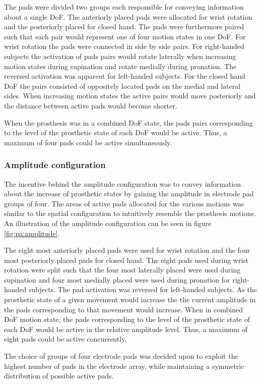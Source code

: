 The pads were divided two groups each responsible for conveying information about a single DoF. The anteriorly placed pads were allocated for wrist rotation and the posteriorly placed for closed hand. The pads were furthermore paired such that each pair would represent one of four motion states in one DoF. For wrist rotation the pads were connected in side by side pairs. For right-handed subjects the activation of pads pairs would rotate laterally when increasing motion states during supination and rotate medially during pronation. The reversed activation was apparent for left-handed subjects. For the closed hand DoF the pairs consisted of oppositely located pads on the medial and lateral sides. When increasing motion states the active pairs would move posteriorly and the distance between active pads would become shorter. 

When the prosthesis was in a combined DoF state, the pads pairs corresponding to the level of the prosthetic state of each DoF would be active. Thus, a maximum of four pads could be active simultaneously. 


\subsubsection{Amplitude configuration}
The incentive behind the amplitude configuration was to convey information about the increase of prosthetic states by gaining the amplitude in electrode pad groups of four. The areas of active pads allocated for the various motions was similar to the spatial configuration to intuitively resemble the prosthesis motions. An illustration of the amplitude configuration can be seen in figure \ref{fig:pa:amplitude}. 

The eight most anteriorly placed pads were used for wrist rotation and the four most posteriorly placed pads for closed hand. The eight pads used during wrist rotation were split such that the four most laterally placed were used during supination and four most medially placed were used during pronation for right-handed subjects. The pad activation was reversed for left-handed subjects. As the prosthetic state of a given movement would increase the the current amplitude in the pads corresponding to that movement would increase. When in combined DoF motion state, the pads corresponding to the level of the prosthetic state of each DoF would be active in the relative amplitude level. Thus, a maximum of eight pads could be active concurrently. 

The choice of groups of four electrode pads was decided upon to exploit the highest number of pads in the electrode array, while maintaining a symmetric distribution of possible active pads.


